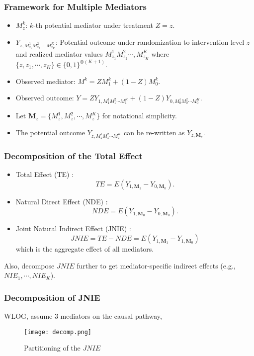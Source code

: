 \documentclass{beamer}
\begin{document}
\begin{frame}
\frametitle{Framework for Multiple Mediators}
\begin{itemize}
\item $M_z^k$: $k$-th potential mediator under treatment $Z=z$.
\item $Y_{z,M_{z_1}^1M_{z_2}^2\cdots ,M_{z_K}^K}$: Potential outcome
  under randomization to intervention level $z$ and realized mediator
  values $M_{z_1}^1M_{z_2}^2\cdots ,M_{z_K}^K$ where $\{z, z_1,
  \cdots, z_K\} \in \{0, 1\}^{\otimes (K+1)}$.
\item Observed mediator: $M^k=ZM_1^k+(1-Z)M_0^k$.
\item Observed outcome:
  $Y=ZY_{1,M_1^1M_1^2\cdots M_1^K}+(1-Z)Y_{0,M_0^1M_0^2\cdots M_0^K}.$
\item Let $\mathbf{M}_z = \{M_z^1,M_z^2,\cdots,M_z^K\}$ for notational
  simplicity.
\item The potential outcome $Y_{z,M_z^1M_z^2\cdots M_z^K}$ can be
  re-written as $Y_{z,\mathbf{M}_z}$.
\end{itemize}
\end{frame}

\begin{frame}
\frametitle{Decomposition of the Total Effect}
\begin{itemize}
\item Total Effect (TE) : 
\[TE  = E(Y_{1,\mathbf{M}_1}-Y_{0,\mathbf{M}_0}).\]
\item Natural Direct Effect (NDE) : 
\[ NDE = E(Y_{1,\mathbf{M}_0}-Y_{0,\mathbf{M}_0}).\]
\item {\color{red} Joint Natural Indirect Effect (JNIE)} :
\[JNIE= TE - NDE = E(Y_{1,\mathbf{M}_1}-Y_{1,\mathbf{M}_0})\]
which is  the aggregate effect of all mediators.
\end{itemize}
Also, decompose $JNIE$ further to get mediator-specific indirect effects (e.g., $NIE_1, \cdots, NIE_K$).
\end{frame}

\begin{frame}
\frametitle{Decomposition of JNIE}
WLOG, assume 3 mediators on the causal pathway,
\begin{figure}[h]
\centering
\scalebox{0.53}
{\texttt{[image: decomp.png]}}
\caption{Partitioning of the $JNIE$}
\end{figure}
\end{frame}
\end{document}
